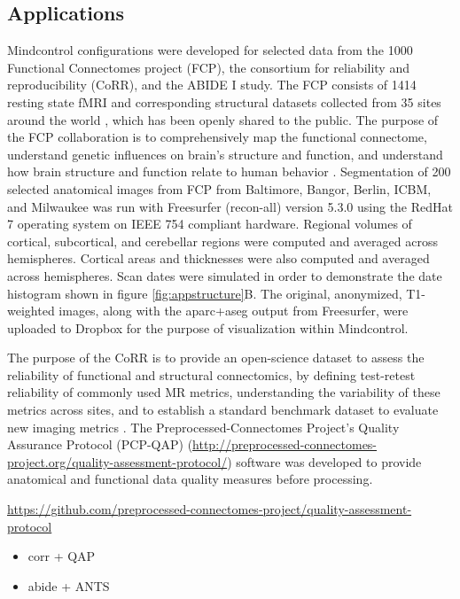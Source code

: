 \subsection{Applications}

Mindcontrol configurations were developed for selected data from the 1000 Functional Connectomes project (FCP), the consortium for reliability and reproducibility (CoRR), and the ABIDE I study. The FCP consists of 1414 resting state fMRI and corresponding structural datasets collected from 35 sites around the world  \cite{biswal2010toward}, which has been openly shared to the public. The purpose of the FCP collaboration is to comprehensively map the functional connectome, understand genetic influences on brain's structure and function, and understand how brain structure and function relate to human behavior \cite{biswal2010toward}. Segmentation of 200 selected anatomical images from FCP from Baltimore, Bangor, Berlin, ICBM, and Milwaukee was run with Freesurfer (recon-all) version 5.3.0 \cite{fischl2002whole} using the RedHat 7 operating system on IEEE 754 compliant hardware. Regional volumes of cortical, subcortical, and cerebellar regions were computed and averaged across hemispheres. Cortical areas and thicknesses were also computed and averaged across hemispheres. Scan dates were simulated in order to demonstrate the date histogram shown in figure \ref{fig:appstructure}B. The original, anonymized, T1-weighted images, along with the aparc+aseg output from Freesurfer, were uploaded to Dropbox for the purpose of visualization within Mindcontrol.

The purpose of the CoRR is to provide an open-science dataset to assess the reliability of functional and structural connectomics, by defining test-retest reliability of commonly used MR metrics, understanding the variability of these metrics across sites, and to establish a standard benchmark dataset to evaluate new imaging metrics \cite{Zuo_2014}. The Preprocessed-Connectomes Project's Quality Assurance Protocol (PCP-QAP) (\href{http://preprocessed-connectomes-project.org/quality-assessment-protocol/}{http://preprocessed-connectomes-project.org/quality-assessment-protocol/}) software was developed to provide anatomical and functional data quality measures before processing. 

\href{http://raw.githubusercontent.com/preprocessed-connectomes-project/quality-assessment-protocol/master/poster_data/corr_anat.csv}{https://github.com/preprocessed-connectomes-project/quality-assessment-protocol} 


\begin{itemize}
\item corr + QAP
\item abide + ANTS
\end{itemize}